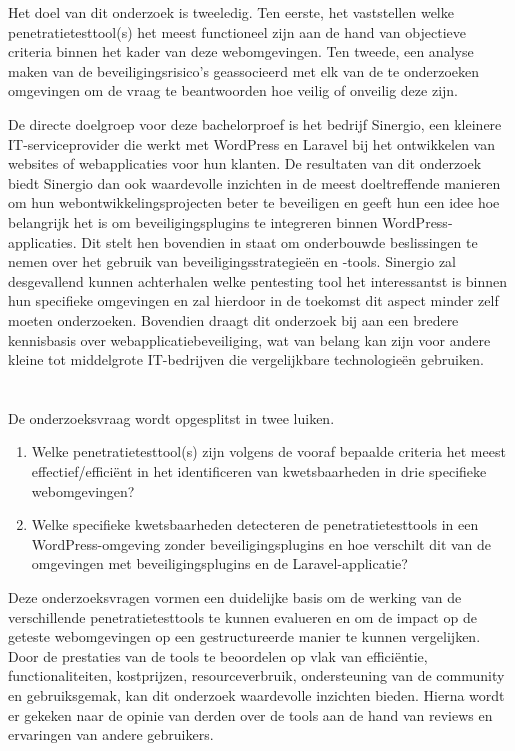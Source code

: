 Het doel van dit onderzoek is tweeledig. 
Ten eerste, het vaststellen welke penetratietesttool(s) het meest functioneel zijn aan de hand van objectieve criteria binnen het kader van deze webomgevingen. Ten tweede, 
een analyse maken van de beveiligingsrisico's geassocieerd met elk van de te onderzoeken omgevingen om de vraag te beantwoorden hoe 
veilig of onveilig deze zijn.

De directe doelgroep voor deze bachelorproef is het bedrijf Sinergio, een kleinere IT-serviceprovider die  
werkt met WordPress en Laravel bij het ontwikkelen van websites of webapplicaties voor hun klanten. De resultaten van dit 
onderzoek biedt Sinergio dan ook waardevolle inzichten in de meest doeltreffende manieren om hun webontwikkelingsprojecten beter 
te beveiligen en geeft hun een idee hoe belangrijk het is om beveiligingsplugins te integreren binnen WordPress-applicaties. 
Dit stelt hen bovendien in staat om onderbouwde beslissingen te nemen over het gebruik van 
beveiligingsstrategieën en -tools. Sinergio zal desgevallend kunnen achterhalen welke pentesting tool het interessantst is 
binnen hun specifieke omgevingen en zal hierdoor in de toekomst dit aspect minder zelf moeten onderzoeken.
Bovendien draagt dit onderzoek bij aan een bredere kennisbasis over webapplicatiebeveiliging, 
wat van belang kan zijn voor andere kleine tot middelgrote IT-bedrijven die vergelijkbare technologieën gebruiken.

\section{}%
\label{sec:onderzoeksvraag}
De onderzoeksvraag wordt opgesplitst in twee luiken.
\begin{enumerate}
  \item Welke penetratietesttool(s) zijn volgens de vooraf bepaalde criteria het meest effectief/efficiënt in het identificeren van kwetsbaarheden in drie specifieke webomgevingen?
  \item Welke specifieke kwetsbaarheden detecteren de penetratietesttools in een WordPress-omgeving zonder beveiligingsplugins en hoe verschilt dit van de omgevingen met beveiligingsplugins en de Laravel-applicatie? 
\end{enumerate}
Deze onderzoeksvragen vormen een duidelijke basis om de werking van de verschillende penetratietesttools te kunnen evalueren 
en om de impact op de geteste webomgevingen op een gestructureerde manier te kunnen vergelijken. Door de prestaties van de 
tools te beoordelen op vlak van efficiëntie, functionaliteiten, kostprijzen, resourceverbruik, ondersteuning van de community en gebruiksgemak, 
kan dit onderzoek waardevolle inzichten bieden. Hierna wordt er gekeken naar de opinie van derden over de tools aan de hand van 
reviews en ervaringen van andere gebruikers.


